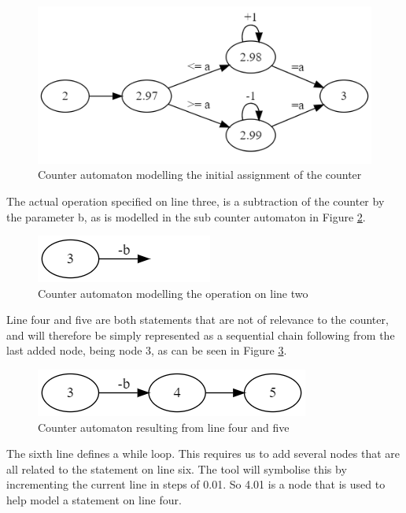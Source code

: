 \documentclass[12pt]{article}
\begin{document}
\begin{figure}[h]
	\centering
	\includegraphics[width=0.7\linewidth]{final_overview_3}
	\caption{Counter automaton modelling the initial assignment of the counter}
	\label{fig:final_overview_3}
\end{figure}

The actual operation specified on line three, is a subtraction of the counter by the parameter b, as is modelled in the sub counter automaton in Figure \ref{fig:final_overview_4}.

\begin{figure}[h]
	\centering
	\includegraphics[width=0.35\linewidth]{final_overview_4}
	\caption{Counter automaton modelling the operation on line two}
	\label{fig:final_overview_4}
\end{figure}

Line four and five are both statements that are not of relevance to the counter, and will therefore be simply represented as a sequential chain following from the last added node, being node 3, as can be seen in Figure \ref{fig:final_overview_5}.

\begin{figure}[h]
	\centering
	\includegraphics[width=0.5\linewidth]{final_overview_5}
	\caption{Counter automaton resulting from line four and five}
	\label{fig:final_overview_5}
\end{figure}

The sixth line defines a while loop. This requires us to add several nodes that are all related to the statement on line six. The tool will symbolise this by incrementing the current line in steps of 0.01. So 4.01 is a node that is used to help model a statement on line four.
\end{document}
